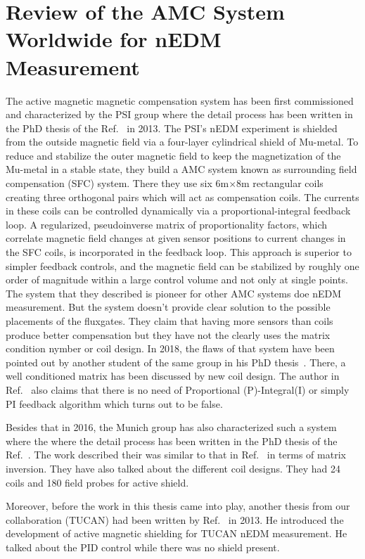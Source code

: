 \section{Review of the AMC System Worldwide for nEDM Measurement}

The active magnetic magnetic compensation system has been first commissioned and characterized by the PSI group where the detail process has been written in the PhD thesis of the Ref.~\cite{bea} in 2013. The PSI's nEDM experiment is shielded from the outside magnetic field via a four-layer cylindrical shield
of Mu-metal. To reduce and stabilize the outer magnetic field to keep the magnetization of the Mu-metal in a stable state, they build a AMC system known as surrounding field compensation (SFC) system. There they use 
six 6m$\times$8m rectangular coils creating three orthogonal pairs which will act as compensation coils. The currents in these coils
can be controlled dynamically via a proportional-integral feedback loop. A regularized, pseudoinverse matrix of proportionality factors, which correlate magnetic field changes at given sensor positions to current changes in the SFC coils, is incorporated in the feedback loop. This approach is superior to simpler feedback controls, and the magnetic field can be stabilized
by roughly one order of magnitude within a large control volume and not only at single points. The system that they described is pioneer for other AMC systems doe nEDM measurement. But the system doesn't provide clear solution to the possible placements of the fluxgates. They claim that having more sensors than coils produce better compensation but they have not the clearly uses the matrix condition nymber or coil design. In 2018, the flaws of that system have been pointed out by another student of the same group in his PhD thesis~\cite{rawlik}. There, a well conditioned matrix has been discussed by new coil design. The author in Ref.~\cite{rawlik} also claims that there is no need of Proportional (P)-Integral(I) or simply PI feedback algorithm which turns out to be false.

Besides that in 2016, the Munich group has also characterized such a system where the where the detail process has been written in the PhD thesis of the Ref.~\cite{lins}. The work described their was similar to that in Ref.~\cite{bea} in terms of matrix inversion. They have also talked about the different coil designs. They had 24 coils and 180 field probes for active shield.

Moreover, before the work in this thesis came into play, another thesis from our collaboration (TUCAN) had been written by Ref.~\cite{mike} in 2013. He introduced the development of active magnetic shielding for TUCAN nEDM measurement. He talked about the PID control while there was no shield present.


